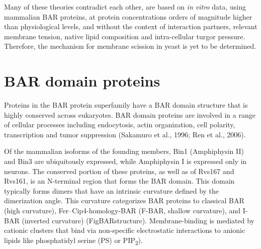 			\vspace{5mm}
Many of these theories contradict each other, are based on \textit{in vitro} data, using mammalian BAR proteins, at protein concentrations orders of magnitude higher than physiological levels, and without the context of interaction partners, relevant membrane tension, native lipid composition and intra-cellular turgor pressure. Therefore, the mechanism for membrane scission in yeast is yet to be determined. 

 




\newpage
		
\section{BAR domain proteins}
	
Proteins in the BAR protein superfamily have a BAR domain structure that is highly conserved across eukaryotes. BAR domain proteins are involved in a range of cellular processes including endocytosis, actin organization, cell polarity, transcription and tumor suppression (Sakamuro et al., 1996; Ren et al., 2006). 

Of the mammalian isoforms of the founding members, Bin1 (Amphiphysin II) and Bin3 are ubiquitously expressed, while Amphiphysin I is expressed only in neurons. The conserved portion of these proteins, as well as of Rvs167 and Rvs161, is an N-terminal region that forms the BAR domain. This domain typically forms dimers that have an intrinsic curvature defined by the dimerization angle. This curvature categorizes BAR proteins to classical BAR (high curvature), Fer–Cip4-homology-BAR (F-BAR, shallow curvature), and I-BAR (inverted curvature) (FigBARstructure). Membrane-binding is mediated by cationic clusters that bind via non-specific electrostatic interactions to anionic lipids like phosphatidyl serine (PS) or PIP\textsubscript{2}).

\vspace{3mm}

